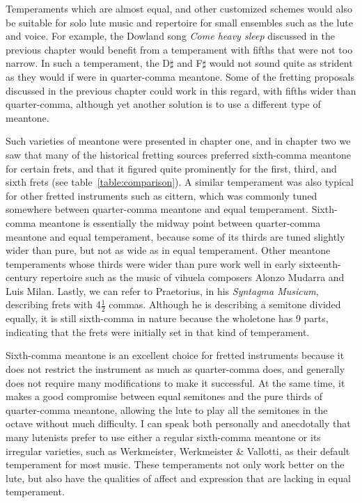 Temperaments which are almost equal, and other customized schemes would also
be suitable for solo lute music and repertoire for small ensembles such as
the lute and voice. For example, the Dowland song \textit{Come heavy sleep} discussed in
the previous chapter would benefit from a temperament with fifths that were not too
narrow.  In such a temperament,  the D$\sharp$ and F$\sharp$ would not sound quite
as strident as they would if were in quarter-comma meantone. Some of the
fretting proposals discussed in the previous chapter could work in this regard,
with fifths wider than quarter-comma, although yet another solution is to use a
different type of meantone.

Such varieties of meantone were presented in chapter one, and in chapter two we saw that many of the
historical fretting sources preferred sixth-comma meantone for certain frets, and that it figured
quite prominently for the first, third, and sixth frets (see table~\ref{table:comparison}). A
similar temperament was also typical for other fretted instruments such as cittern, which was
commonly tuned somewhere between quarter-comma meantone and equal temperament. \autocite[12]{PF:1}
Sixth-comma meantone is essentially the midway point between quarter-comma meantone and equal
temperament, because some of its thirds are tuned slightly wider than pure, but not as wide as in
equal temperament. Other meantone temperaments whose thirds were wider than pure work well in early
sixteenth-century repertoire such as the music of vihuela composers Alonzo Mudarra and Luis
Milan.\autocite[56]{WH:1} Lastly, we can refer to Praetorius, in his \textit{Syntagma Musicum},
describing frets with 4$ \frac{1}{2} $ commas.\autocite[68]{MP:1} Although he is describing a
semitone divided equally, it is still sixth-comma in nature because the wholetone has 9 parts,
indicating that the frets were initially set in that kind of temperament.

Sixth-comma meantone is an excellent choice for fretted instruments because it does not restrict the
instrument as much as quarter-comma does, and generally does not require many modifications to make
it successful. At the same time, it makes a good compromise between equal semitones and the pure
thirds of quarter-comma meantone, allowing the lute to play all the semitones in the octave without
much difficulty. I can speak both personally and anecdotally that many lutenists prefer to use
either a regular sixth-comma meantone or its irregular varieties, such as Werkmeister, Werkmeister &
Vallotti, as their default temperament for most music. These temperaments not only work better on
the lute, but also have the qualities of affect and expression that are lacking in equal
temperament.

